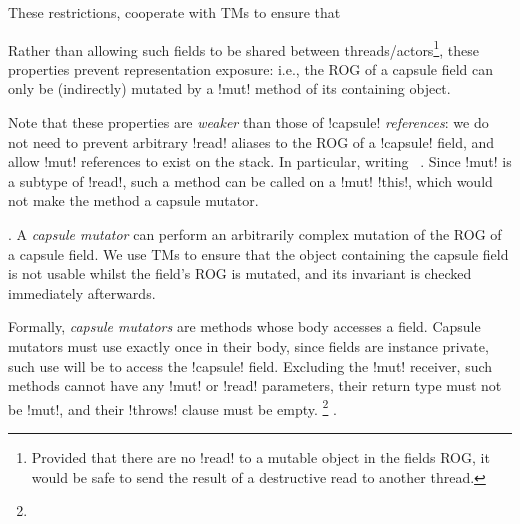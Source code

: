 These restrictions, cooperate with TMs to ensure that  

Rather than allowing such fields to be shared between threads/actors\footnote{Provided that there are no \Q!read!  to a mutable object in the fields ROG, it would be safe to send the result of a destructive read to another thread.}, these properties prevent representation exposure: i.e., the ROG of a capsule field can only be (indirectly) mutated by a \Q!mut! method of its containing object.

Note that these properties are \emph{weaker} than those of \Q!capsule! \emph{references}: we do not need to prevent arbitrary \Q!read! aliases to the ROG of a \Q!capsule! field, and allow \Q!mut! references to exist on the stack. In particular,  writing  ~\cite{?}. Since \Q!mut! is a subtype of \Q!read!, such a method can be called on a \Q!mut! \Q!this!, which would not make the method  a capsule mutator.

. A \emph{capsule mutator} can perform an arbitrarily complex mutation of the ROG of a capsule field. We use TMs to ensure that the object containing the capsule field is not usable whilst the field's ROG is mutated, and its invariant is checked immediately afterwards. 

Formally, \emph{capsule mutators} are \Q@mut@ methods whose body accesses a \Q@capsule@ field. 
Capsule mutators must use \Q@this@ exactly once in their body, since fields are instance private, such use will be to access the \Q!capsule! field.
Excluding the \Q!mut! receiver, such methods cannot have any \Q!mut! or \Q!read! parameters, their return type must not be \Q!mut!, and their \Q!throws! clause must be empty.%
\footnote{}
.


